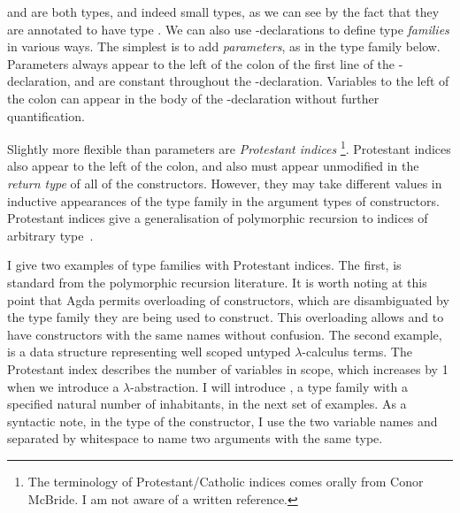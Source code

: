  and  are both types, and indeed
small types, as we can see by the fact that they are annotated to have type
.
We can also use -declarations to define type \emph{families}
in various ways.
The simplest is to add \emph{parameters}, as in the type family
 below.
Parameters always appear to the left of the colon of the first line of the
-declaration, and are constant throughout the
-declaration.
Variables to the left of the colon can appear in the body of the
-declaration without further quantification.


Slightly more flexible than parameters are \emph{Protestant indices}%
\footnote{The terminology of Protestant/Catholic indices comes orally from Conor
McBride. I am not aware of a written reference.}.
Protestant indices also appear to the left of the colon, and also must appear
unmodified in the \emph{return type} of all of the constructors.
However, they may take different values in inductive appearances of the type
family in the argument types of constructors.
Protestant indices give a generalisation of polymorphic
recursion to indices of arbitrary type~\citep{Mycroft84,Henglein93}.

I give two examples of type families with Protestant indices.
The first,  is standard from the polymorphic recursion
literature.
It is worth noting at this point that Agda permits overloading of constructors,
which are disambiguated by the type family they are being used to construct.
This overloading allows  and  to
have constructors with the same names without confusion.
The second example,  is a data structure representing
well scoped untyped $\lambda$-calculus terms.
The Protestant index  describes the number of variables in scope,
which increases by 1 when we introduce a $\lambda$-abstraction.
I will introduce , a type family with a specified natural
number of inhabitants, in the next set of examples.
As a syntactic note, in the type of the 
constructor, I use the two variable names  and 
separated by whitespace to name two arguments with the same type.


